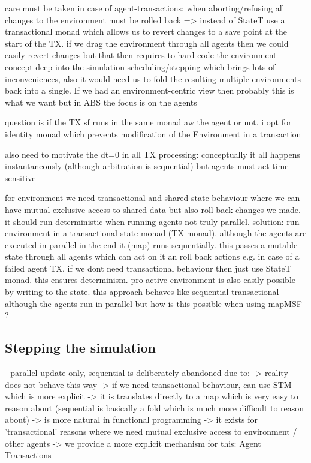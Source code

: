 care must be taken in case of agent-transactions: when aborting/refusing all changes to the environment must be rolled back => instead of StateT use a transactional monad which allows us to revert changes to a save point at the start of the TX. if we drag the environment through all agents then we could easily revert changes but that then requires to hard-code the environment concept deep into the simulation scheduling/stepping which brings lots of inconveniences, also it would need us to fold the resulting multiple environments back into a single. If we had an environment-centric view then probably this is what we want but in ABS the focus is on the agents

question is if the TX sf runs in the same monad aw the agent or not. i opt for identity monad which prevents modification of the Environment in a transaction

also need to motivate the dt=0 in all TX processing: conceptually it all happens instantaneously (although arbitration is sequential) but agents must act time-sensitive

for environment we need transactional and shared state behaviour where we can have mutual exclusive access to shared data but also roll back changes we made. it should run deterministic when running agents not truly parallel. solution: run environment in a transactional state monad (TX monad). although the agents are executed in parallel in the end it (map) runs sequentially. this passes a mutable state through all agents which can act on it an roll back actions e.g. in case of a failed agent TX. if we dont need transactional behaviour then just use StateT monad. this ensures determinism. pro active environment is also easily possible by writing to the state. this approach behaves like sequential transactional although the agents run in parallel but how is this possible when using mapMSF ?

\subsection{Stepping the simulation}

- parallel update only, sequential is deliberately abandoned due to:
		-> reality does not behave this way
		-> if we need transactional behaviour, can use STM which is more explicit
		-> it is translates directly to a map which is very easy to reason about (sequential is basically a fold which is much more difficult to reason about)
		-> is more natural in functional programming
		-> it exists for 'transactional' reasons where we need mutual exclusive access to environment / other agents
			-> we provide a more explicit mechanism for this: Agent Transactions
			